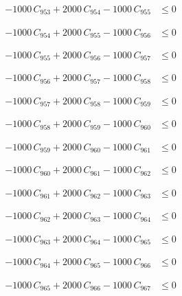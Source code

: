 \documentclass[a4paper,11pt]{article}
\begin{document}
\begin{align}
-1000\,C_{953} + 2000\,C_{954} - 1000\,C_{955} &\leq 0 \nonumber
\end{align}

\begin{align}
-1000\,C_{954} + 2000\,C_{955} - 1000\,C_{956} &\leq 0 \nonumber
\end{align}

\begin{align}
-1000\,C_{955} + 2000\,C_{956} - 1000\,C_{957} &\leq 0 \nonumber
\end{align}

\begin{align}
-1000\,C_{956} + 2000\,C_{957} - 1000\,C_{958} &\leq 0 \nonumber
\end{align}

\begin{align}
-1000\,C_{957} + 2000\,C_{958} - 1000\,C_{959} &\leq 0 \nonumber
\end{align}

\begin{align}
-1000\,C_{958} + 2000\,C_{959} - 1000\,C_{960} &\leq 0 \nonumber
\end{align}

\begin{align}
-1000\,C_{959} + 2000\,C_{960} - 1000\,C_{961} &\leq 0 \nonumber
\end{align}

\begin{align}
-1000\,C_{960} + 2000\,C_{961} - 1000\,C_{962} &\leq 0 \nonumber
\end{align}

\begin{align}
-1000\,C_{961} + 2000\,C_{962} - 1000\,C_{963} &\leq 0 \nonumber
\end{align}

\begin{align}
-1000\,C_{962} + 2000\,C_{963} - 1000\,C_{964} &\leq 0 \nonumber
\end{align}

\begin{align}
-1000\,C_{963} + 2000\,C_{964} - 1000\,C_{965} &\leq 0 \nonumber
\end{align}

\begin{align}
-1000\,C_{964} + 2000\,C_{965} - 1000\,C_{966} &\leq 0 \nonumber
\end{align}

\begin{align}
-1000\,C_{965} + 2000\,C_{966} - 1000\,C_{967} &\leq 0 \nonumber
\end{align}
\end{document}

